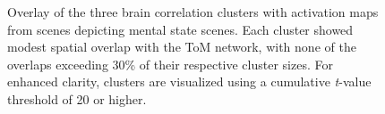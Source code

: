 \begin{figure}[!ht]
	\centering
	\caption{Overlay of the three brain correlation clusters with activation maps from scenes depicting mental state scenes. Each cluster showed modest spatial overlap with the ToM network, with none of the overlaps exceeding 30\% of their respective cluster sizes. For enhanced clarity, clusters are visualized using a cumulative \textit{t}-value threshold of 20 or higher.}
    \vspace*{-10pt}
	\label{fig:isc-fmri-overlap}
\end{figure}

